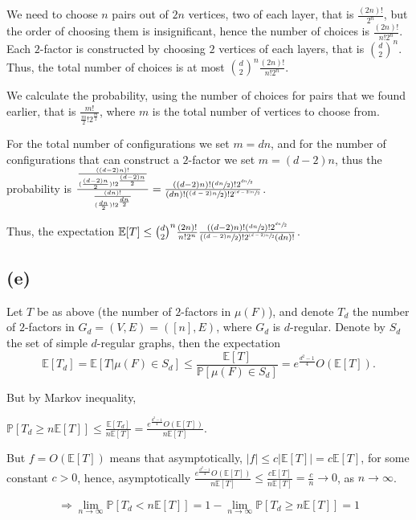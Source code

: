 \documentclass{article}
\begin{document}
We need to choose $n$ pairs out of $2n$ vertices, two of each layer, that is $\frac{(2n)!}{2^n}$, but the order of choosing them is insignificant, hence the number of choices is $\frac{(2n)!}{n!2^n}$.
Each $2$-factor is constructed by choosing $2$ vertices of each layers, that is $\binom{d}{2}^n$. Thus, the total number of choices is at most $\binom{d}{2}^n\frac{(2n)!}{n!2^n}$.

We calculate the probability, using the number of choices for pairs that we found earlier, that is $\frac{m!}{\frac{m}{2}!2^{\frac{m}{2}}}$, where $m$ is the total number of vertices to choose from.

For the total number of configurations we set $m=dn$, and for the number of configurations that can construct a $2$-factor we set $m=(d-2)n$, thus the probability is $
\frac{\frac{((d-2)n)!}{(\frac{(d-2)n}{2})!2^{\frac{(d-2)n}{2}}}}{\frac{(dn)!}{(\frac{dn}{2})!2^{\frac{dn}{2}}}}=\frac{((d-2)n)!(\sfrac{dn}{2})!2^{\sfrac{dn}{2}}}{(dn)!(\sfrac{(d-2)n}{2})!2^{\sfrac{(d-2)n}{2}}}$.

Thus, the expectation $\mathbb{E}[T]\leq\binom{d}{2}^n\frac{(2n)!}{n!2^n}\frac{((d-2)n)!(\sfrac{dn}{2})!2^{\sfrac{dn}{2}}}{(\sfrac{(d-2)n}{2})!2^{\sfrac{(d-2)n}{2}}(dn)!}$.

\subsection*{(e)}
Let $T$ be as above (the number of $2$-factors in $\mu(F)$), and denote $T_d$ the number of $2$-factors in $G_d=(V,E)=([n],E)$, where $G_d$ is $d$-regular. Denote by $S_d$ the set of simple $d$-regular graphs, then the expectation 
\[\mathbb{E}[T_d]=\mathbb{E}[T|\mu(F)\in{S_d}]\leq\frac{\mathbb{E}[T]}{\mathbb{P}[\mu(F)\in{S_d}]}=e^{\frac{d^2-1}{4}}O(\mathbb{E}[T]).\]

But by Markov inequality,

$\mathbb{P}[T_d\geq{n\mathbb{E}[T]}]\leq\frac{\mathbb{E}[T_d]}{n\mathbb{E}[T]}=\frac{e^{\frac{d^2-1}{4}}O(\mathbb{E}[T])}{n\mathbb{E}[T]}$.

But $f=O(\mathbb{E}[T])$ means that asymptotically, $|f|\leq{c|\mathbb{E}[T]|}=c\mathbb{E}[T]$, for some constant $c>0$, hence, asymptotically $\frac{e^{\frac{d^2-1}{4}}O(\mathbb{E}[T])}{n\mathbb{E}[T]}\leq\frac{c\mathbb{E}[T]}{n\mathbb{E}[T]}=\frac{c}{n}\rightarrow{0}$, as $n\rightarrow\infty$.

\[
\Rightarrow\lim_{n\rightarrow\infty}\mathbb{P}[T_d<n\mathbb{E}[T]]=1-\lim_{n\rightarrow\infty}\mathbb{P}[T_d\geq{n\mathbb{E}[T]}]=1
\]
\end{document}
